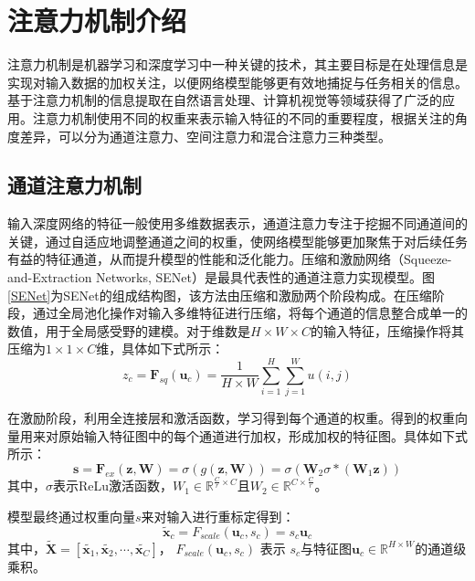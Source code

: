

\section{注意力机制介绍}
\label{sec:sce3_1}
注意力机制是机器学习和深度学习中一种关键的技术，其主要目标是在处理信息是实现对输入数据的加权关注，以便网络模型能够更有效地捕捉与任务相关的信息。基于注意力机制的信息提取在自然语言处理、计算机视觉等领域获得了广泛的应用\citing{}。注意力机制使用不同的权重来表示输入特征的不同的重要程度，根据关注的角度差异，可以分为通道注意力、空间注意力和混合注意力三种类型。
\subsection{通道注意力机制}
输入深度网络的特征一般使用多维数据表示，通道注意力专注于挖掘不同通道间的关键，通过自适应地调整通道之间的权重，使网络模型能够更加聚焦于对后续任务有益的特征通道，从而提升模型的性能和泛化能力。压缩和激励网络（Squeeze-and-Extraction Networks, SENet）是最具代表性的通道注意力实现模型。图\ref{SENet}为SENet的组成结构图，该方法由压缩和激励两个阶段构成。在压缩阶段，通过全局池化操作对输入多维特征进行压缩，将每个通道的信息整合成单一的数值，用于全局感受野的建模。对于维数是$H\times W \times C$的输入特征，压缩操作将其压缩为$1 \times 1 \times C$维，具体如下式所示：
\begin{equation}
    z_c=\mathbf{F}_{sq}\left( \mathbf{u}_c \right) =\frac{1}{H\times W}\sum_{i=1}^H{\sum_{j=1}^W{u\left( i,j \right)}}
\end{equation}

在激励阶段，利用全连接层和激活函数，学习得到每个通道的权重。得到的权重向量用来对原始输入特征图中的每个通道进行加权，形成加权的特征图。具体如下式所示：
\begin{equation}
    \mathbf{s}=\mathbf{F}_{ex}\left( \mathbf{z},\mathbf{W} \right) =\sigma \left( g\left( \mathbf{z},\mathbf{W} \right) \right) =\sigma \left( \mathbf{W}_2\sigma *\left( \mathbf{W}_1\mathbf{z} \right) \right)
\end{equation}
其中，$\sigma$表示ReLu激活函数，$W_1 \in \mathbb{R}^{\frac{C}{r}\times C}$且$W_2 \in \mathbb{R}^{C \times \frac{C}{r}}$。

模型最终通过权重向量$s$来对输入进行重标定得到：
\begin{equation}
    \widetilde{\mathbf{x}}_c=F_{scale}\left( \mathbf{u}_c,s_c \right) =s_c\mathbf{u}_c
\end{equation}
其中，$ \widetilde{\mathbf{X}}=\left[ \widetilde{\mathbf{x}_1},\widetilde{\mathbf{x}_2},\cdots ,\widetilde{\mathbf{x}_C} \right] $， $F_{scale}\left( \mathbf{u}_c,s_c \right)$ 表示 $s_c$与特征图$\mathbf{u}_c \in \mathbb{R}^{H\times W}$的通道级乘积。


